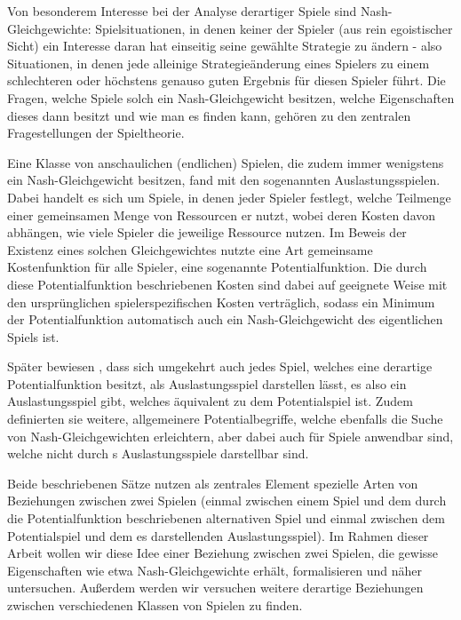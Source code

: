 \documentclass[a4paper,ngerman,11pt,bibliography=totoc]{scrartcl}
\theoremstyle{definition}
\theoremstyle{plain}
\theoremstyle{remark}
\begin{document}
Von besonderem Interesse bei der Analyse derartiger Spiele sind Nash-Gleichgewichte: Spielsituationen, in denen keiner der Spieler (aus rein egoistischer Sicht) ein Interesse daran hat einseitig seine gewählte Strategie zu ändern - also Situationen, in denen jede alleinige Strategieänderung eines Spielers zu einem schlechteren oder höchstens genauso guten Ergebnis für diesen Spieler führt. Die Fragen, welche Spiele solch ein Nash-Gleichgewicht besitzen, welche Eigenschaften dieses dann besitzt und wie man es finden kann, gehören zu den zentralen Fragestellungen der Spieltheorie.

Eine Klasse von anschaulichen (endlichen) Spielen, die zudem immer wenigstens ein Nash-Gleichgewicht besitzen, fand \citeauthor{RosenthalPotential} mit den sogenannten Auslastungsspielen. Dabei handelt es sich um Spiele, in denen jeder Spieler festlegt, welche Teilmenge einer gemeinsamen Menge von Ressourcen er nutzt, wobei deren Kosten davon abhängen, wie viele Spieler die jeweilige Ressource nutzen. Im Beweis der Existenz eines solchen Gleichgewichtes nutzte \citeauthor{RosenthalPotential} eine Art gemeinsame Kostenfunktion für alle Spieler, eine sogenannte Potentialfunktion. Die durch diese Potentialfunktion beschriebenen Kosten sind dabei auf geeignete Weise mit den ursprünglichen spielerspezifischen Kosten verträglich, sodass ein Minimum der Potentialfunktion automatisch auch ein Nash-Gleichgewicht des eigentlichen Spiels ist.

Später bewiesen \citeauthor{MonShap}, dass sich umgekehrt auch jedes Spiel, welches eine derartige Potentialfunktion besitzt, als Auslastungsspiel darstellen lässt, es also ein Auslastungsspiel gibt, welches äquivalent zu dem Potentialspiel ist. Zudem definierten sie weitere, allgemeinere Potentialbegriffe, welche ebenfalls die Suche von Nash-Gleichgewichten erleichtern, aber dabei auch für Spiele anwendbar sind, welche nicht durch \citeauthor{RosenthalPotential}s Auslastungsspiele darstellbar sind. 

Beide beschriebenen Sätze nutzen als zentrales Element spezielle Arten von Beziehungen zwischen zwei Spielen (einmal zwischen einem Spiel und dem durch die Potentialfunktion beschriebenen alternativen Spiel und einmal zwischen dem Potentialspiel und dem es darstellenden Auslastungsspiel). Im Rahmen dieser Arbeit wollen wir diese Idee einer Beziehung zwischen zwei Spielen, die gewisse Eigenschaften wie etwa Nash-Gleichgewichte erhält, formalisieren und näher untersuchen. Außerdem werden wir versuchen weitere derartige Beziehungen zwischen verschiedenen Klassen von Spielen zu finden.
\end{document}
